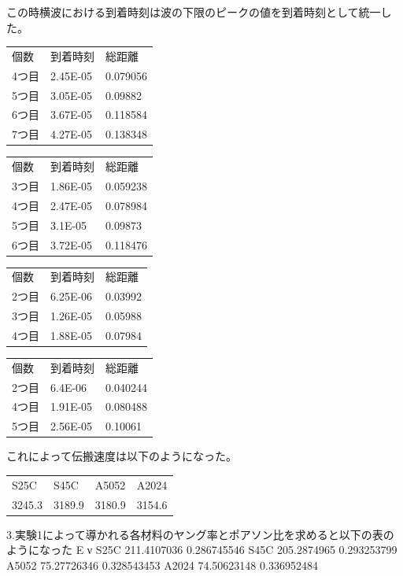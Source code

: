 \documentclass[uplatex,dvipdfmx,titlepage]{jsarticle}
\begin{document}
この時横波における到着時刻は波の下限のピークの値を到着時刻として統一した。
\begin{table}[]
\begin{tabular}{lll}
個数  & 到着時刻     & 総距離      \\
4つ目 & 2.45E-05 & 0.079056 \\
5つ目 & 3.05E-05 & 0.09882  \\
6つ目 & 3.67E-05 & 0.118584 \\
7つ目 & 4.27E-05 & 0.138348
\end{tabular}
\end{table}
\begin{table}[]
\begin{tabular}{lll}
個数  & 到着時刻     & 総距離      \\
3つ目 & 1.86E-05 & 0.059238 \\
4つ目 & 2.47E-05 & 0.078984 \\
5つ目 & 3.1E-05  & 0.09873  \\
6つ目 & 3.72E-05 & 0.118476
\end{tabular}
\end{table}
\begin{table}[]
\begin{tabular}{lll}
個数  & 到着時刻     & 総距離     \\
2つ目 & 6.25E-06 & 0.03992 \\
3つ目 & 1.26E-05 & 0.05988 \\
4つ目 & 1.88E-05 & 0.07984
\end{tabular}
\end{table}
\begin{table}[]
\begin{tabular}{lll}
個数  & 到着時刻     & 総距離      \\
2つ目 & 6.4E-06  & 0.040244 \\
4つ目 & 1.91E-05 & 0.080488 \\
5つ目 & 2.56E-05 & 0.10061 
\end{tabular}
\end{table}

これによって伝搬速度は以下のようになった。
\begin{table}[]
\begin{tabular}{llll}
S25C   & S45C   & A5052  & A2024  \\
3245.3 & 3189.9 & 3180.9 & 3154.6
\end{tabular}
\end{table}
3.実験1によって導かれる各材料のヤング率とポアソン比を求めると以下の表のようになった
	E	ν
S25C	211.4107036	0.286745546
S45C	205.2874965	0.293253799
A5052	75.27726346	0.328543453
A2024	74.50623148	0.336952484
\end{document}
